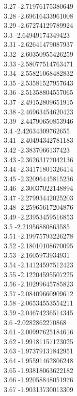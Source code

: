 {3.27	-2.71976175380649\\
3.28	-2.69616433961008\\
3.29	-2.67274129789924\\
3.3	-2.64949174349423\\
3.31	-2.62641479087937\\
3.32	-2.60350955426259\\
3.33	-2.58077514763471\\
3.34	-2.55821068482832\\
3.35	-2.53581527957643\\
3.36	-2.51358804557065\\
3.37	-2.49152809651915\\
3.38	-2.46963454620423\\
3.39	-2.44790650853946\\
3.4	-2.42634309762655\\
3.41	-2.40494342781183\\
3.42	-2.3837066137423\\
3.43	-2.36263177042136\\
3.44	-2.34171801326414\\
3.45	-2.32096445815236\\
3.46	-2.30037022148894\\
3.47	-2.27993442025203\\
3.48	-2.25965617204876\\
3.49	-2.23953459516853\\
3.5	-2.21956880863585\\
3.51	-2.19975793226278\\
3.52	-2.18010108670095\\
3.53	-2.1605973934931\\
3.54	-2.14124597512423\\
3.55	-2.12204595507225\\
3.56	-2.10299645785823\\
3.57	-2.08409660909612\\
3.58	-2.06534553554211\\
3.59	-2.04674236514345\\
3.6	-2.0282862270868\\
3.61	-2.00997625184616\\
3.62	-1.99181157123025\\
3.63	-1.97379131842951\\
3.64	-1.95591462806248\\
3.65	-1.93818063622182\\
3.66	-1.92058848051976\\
3.67	-1.90313730013309\\
}
